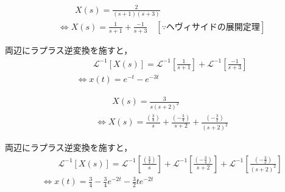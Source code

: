 \documentclass[a4paper,12pt]{article}
\begin{document}
\begin{tcolorbox}[title={ [12] (6) \( X(s)=\frac{ 2 }{ ( s + 1 ) ( s + 3 ) } \)}]
\vspace{-3mm}
\begin{align*}
    &\qquad X(s) =\frac{ 2 }{ ( s + 1 ) ( s + 3 ) }  \\
    &\Leftrightarrow X(s) 
    = \frac{1}{s + 1}
    + \frac{-1}{s + 3} 
    \quad [\because ヘヴィサイドの展開定理]
\end{align*}

\quad 両辺にラプラス逆変換を施すと，
\vspace{-3mm}
\begin{align*}
    &\qquad \mathcal{L}^{-1} \left[ X(s) \right] 
    =\mathcal{L}^{-1} \left[ \frac{1}{s + 1} \right]
    +\mathcal{L}^{-1} \left[ \frac{-1}{s + 3} \right] \\
    &\Leftrightarrow x(t) = e^{-t} - e^{-3t}
\end{align*}
\end{tcolorbox}
\begin{tcolorbox}[title={ [12] (7) \( X(s)=\frac{ 3 }{ s ( s + 2)^2 } \)}]
\vspace{-3mm}
\begin{align*}
    &\qquad X(s) =\frac{ 3 }{ s ( s + 2)^2 }  \\
    &\Leftrightarrow X(s) 
    = \frac{(\frac{3}{4})}{s}
    + \frac{(-\frac{3}{4})}{s + 2} 
    + \frac{(-\frac{3}{2})}{(s + 2)^2} 
\end{align*}

\quad 両辺にラプラス逆変換を施すと，
\vspace{-3mm}
\begin{align*}
    &\qquad \mathcal{L}^{-1} \left[ X(s) \right] 
    = \mathcal{L}^{-1} \left[\frac{(\frac{3}{4})}{s} \right]
    + \mathcal{L}^{-1} \left[ \frac{(-\frac{3}{4})}{s + 2} \right]
    + \mathcal{L}^{-1} \left[\frac{(-\frac{3}{2})}{(s + 2)^2}\right]\\
    &\Leftrightarrow x(t) = \frac{3}{4}-\frac{3}{4}e^{-2t}-\frac{3}{2}te^{-2t}
\end{align*}
\end{tcolorbox}
\end{document}
